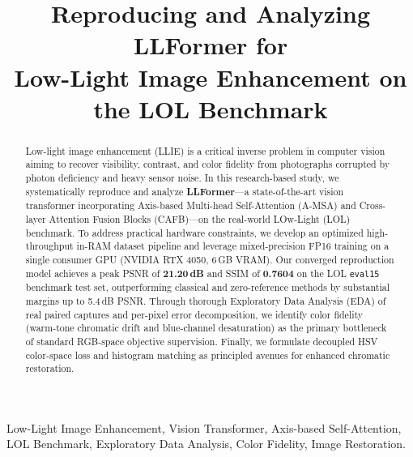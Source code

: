 \documentclass[conference]{IEEEtran}
\begin{document}
\title{Reproducing and Analyzing LLFormer for\\
       Low-Light Image Enhancement on the LOL Benchmark}

\author{
}

\maketitle

\begin{abstract}
Low-light image enhancement (LLIE) is a critical inverse problem in computer vision aiming to recover visibility, contrast, and color fidelity from photographs corrupted by photon deficiency and heavy sensor noise. In this research-based study, we systematically reproduce and analyze \textbf{LLFormer}---a state-of-the-art vision transformer incorporating Axis-based Multi-head Self-Attention (A-MSA) and Cross-layer Attention Fusion Blocks (CAFB)---on the real-world LOw-Light (LOL) benchmark. To address practical hardware constraints, we develop an optimized high-throughput in-RAM dataset pipeline and leverage mixed-precision FP16 training on a single consumer GPU (NVIDIA RTX 4050, 6\,GB VRAM). Our converged reproduction model achieves a peak PSNR of \textbf{21.20\,dB} and SSIM of \textbf{0.7604} on the LOL \texttt{eval15} benchmark test set, outperforming classical and zero-reference methods by substantial margins up to 5.4\,dB PSNR. Through thorough Exploratory Data Analysis (EDA) of real paired captures and per-pixel error decomposition, we identify color fidelity (warm-tone chromatic drift and blue-channel desaturation) as the primary bottleneck of standard RGB-space objective supervision. Finally, we formulate decoupled HSV color-space loss and histogram matching as principled avenues for enhanced chromatic restoration.
\end{abstract}

\begin{IEEEkeywords}
Low-Light Image Enhancement, Vision Transformer, Axis-based Self-Attention, LOL Benchmark, Exploratory Data Analysis, Color Fidelity, Image Restoration.
\end{IEEEkeywords}
\end{document}
